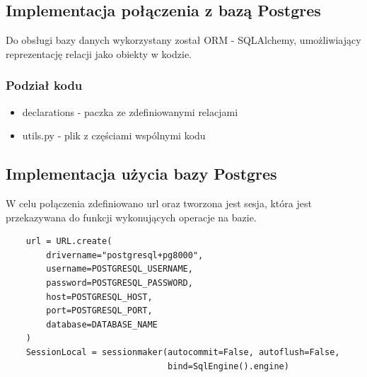 \subsection{Implementacja połączenia z bazą Postgres}
Do obsługi bazy danych wykorzystany został ORM - SQLAlchemy, umożliwiający reprezentację relacji jako obiekty w kodzie.
\subsubsection{Podział kodu}
\begin{itemize}
    \item declarations - paczka ze zdefiniowanymi relacjami
    \item utils.py - plik z częściami wspólnymi kodu
\end{itemize}
\subsection{Implementacja użycia bazy Postgres}
W celu połączenia zdefiniowano url oraz tworzona jest sesja, która jest przekazywana do funkcji wykonujących operacje na bazie.
\begin{verbatim}
    url = URL.create(
        drivername="postgresql+pg8000",
        username=POSTGRESQL_USERNAME,
        password=POSTGRESQL_PASSWORD,
        host=POSTGRESQL_HOST,
        port=POSTGRESQL_PORT,
        database=DATABASE_NAME
    )
    SessionLocal = sessionmaker(autocommit=False, autoflush=False,
                                bind=SqlEngine().engine)
\end{verbatim}

